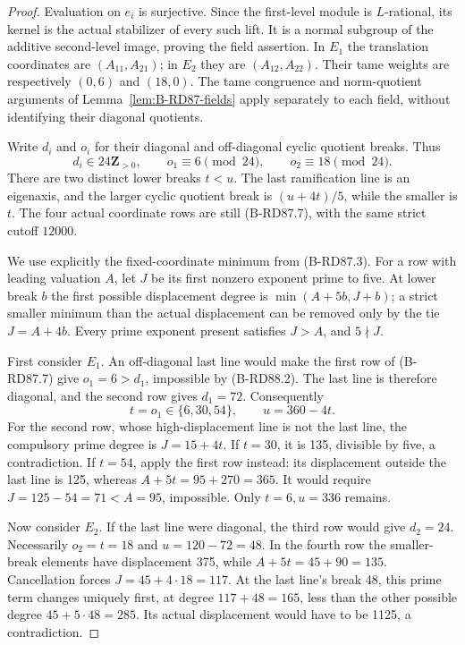 \begin{proof}
Evaluation on \(e_i\) is surjective. Since the first-level
module is \(L\)-rational, its kernel is the actual stabilizer
of every such lift. It is a normal subgroup of the additive
second-level image, proving the field assertion. In \(E_1\)
the translation coordinates are \((A_{11},A_{21})\);
in \(E_2\) they are \((A_{12},A_{22})\).
Their tame weights are respectively \((0,6)\) and
\((18,0)\). The tame congruence and norm-quotient arguments
of Lemma~\ref{lem:B-RD87-fields} apply separately to each
field, without identifying their diagonal quotients.

Write \(d_i\) and \(o_i\) for their diagonal and
off-diagonal cyclic quotient breaks. Thus
\[
 d_i\in24\mathbf Z_{>0},\qquad
 o_1\equiv6\pmod{24},\qquad o_2\equiv18\pmod{24}.
                                                        \tag{B-RD88.2}
\]
There are two distinct lower breaks \(t<u\). The last
ramification line is an eigenaxis, and the larger cyclic
quotient break is \((u+4t)/5\), while the smaller is \(t\).
The four actual coordinate rows are still (B-RD87.7),
with the same strict cutoff \(12000\).

We use explicitly the fixed-coordinate minimum from
(B-RD87.3). For a row with leading valuation \(A\),
let \(J\) be its first nonzero exponent prime to five.
At lower break \(b\) the first possible displacement
degree is \(\min(A+5b,J+b)\); a strict smaller minimum
than the actual displacement can be removed only by
the tie \(J=A+4b\). Every prime exponent present
satisfies \(J>A\), and \(5\nmid J\).

First consider \(E_1\). An off-diagonal last line
would make the first row of (B-RD87.7) give
\(o_1=6>d_1\), impossible by (B-RD88.2).
The last line is therefore diagonal, and the second
row gives \(d_1=72\). Consequently
\[
       t=o_1\in\{6,30,54\},\qquad u=360-4t.          \tag{B-RD88.3}
\]
For the second row, whose high-displacement line is not
the last line, the compulsory prime degree is
\(J=15+4t\). If \(t=30\), it is 135, divisible by
five, a contradiction. If \(t=54\), apply the first
row instead: its displacement outside the last line
is 125, whereas \(A+5t=95+270=365\).
It would require \(J=125-54=71<A=95\), impossible.
Only \(t=6,u=336\) remains.

Now consider \(E_2\). If the last line were diagonal,
the third row would give \(d_2=24\). Necessarily
\(o_2=t=18\) and \(u=120-72=48\).
In the fourth row the smaller-break elements have
displacement 375, while \(A+5t=45+90=135\).
Cancellation forces \(J=45+4\cdot18=117\).
At the last line's break 48, this prime term changes
uniquely first, at degree \(117+48=165\), less than
the other possible degree \(45+5\cdot48=285\).
Its actual displacement would have to be 1125,
a contradiction.


\end{proof}
